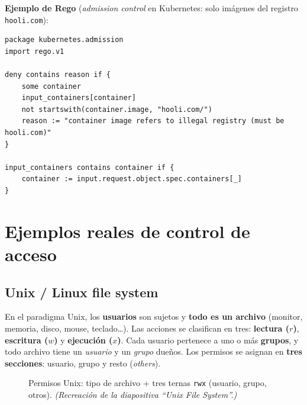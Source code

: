 \documentclass[11pt,a4paper]{article}
\begin{document}
\begin{slidebox}
\textbf{Ejemplo de Rego} (\emph{admission control} en Kubernetes: solo imágenes del registro
\texttt{hooli.com}):
\begin{lstlisting}[style=code]
package kubernetes.admission
import rego.v1

deny contains reason if {
    some container
    input_containers[container]
    not startswith(container.image, "hooli.com/")
    reason := "container image refers to illegal registry (must be hooli.com)"
}

input_containers contains container if {
    container := input.request.object.spec.containers[_]
}
\end{lstlisting}
\end{slidebox}

\section{Ejemplos reales de control de acceso}

\subsection{Unix / Linux file system}
En el paradigma Unix, los \textbf{usuarios} son sujetos y \textbf{todo es un archivo}
(monitor, memoria, disco, mouse, teclado\dots). Las acciones se clasifican en tres:
\textbf{lectura ($r$)}, \textbf{escritura ($w$)} y \textbf{ejecución ($x$)}. Cada usuario
pertenece a uno o más \textbf{grupos}, y todo archivo tiene un \emph{usuario} y un
\emph{grupo} dueños. Los permisos se asignan en \textbf{tres secciones}: usuario, grupo y
resto (\emph{others}).

\begin{figure}[h]
\centering
{}
\caption{Permisos Unix: tipo de archivo + tres ternas \texttt{rwx} (usuario, grupo, otros).
\textit{(Recreación de la diapositiva ``Unix File System''.)}}
\end{figure}
\end{document}
